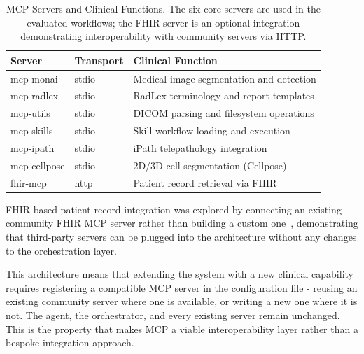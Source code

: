 \documentclass[conference]{IEEEtran}
\begin{document}
\begin{table}[t]
  \caption{MCP Servers and Clinical Functions. The six core servers are used in the evaluated workflows; the FHIR server is an optional integration demonstrating interoperability with community servers via HTTP.}
  \label{tab:mcp-servers}
  \centering
  \begin{tabular}{lll}
    \toprule
    Server & Transport & Clinical Function \\
    \midrule
    mcp-monai    & stdio & Medical image segmentation and detection \\
    mcp-radlex   & stdio & RadLex terminology and report templates \\
    mcp-utils    & stdio & DICOM parsing and filesystem operations \\
    mcp-skills   & stdio & Skill workflow loading and execution \\
    mcp-ipath    & stdio & iPath telepathology integration \\
    mcp-cellpose & stdio & 2D/3D cell segmentation (Cellpose) \\
    fhir-mcp     & http  & Patient record retrieval via FHIR \\
    \bottomrule
  \end{tabular}
\end{table}
FHIR-based patient record integration was explored by connecting an existing community FHIR MCP server rather than building a custom one~\cite{ehtesham2025mcpfhir}, demonstrating that third-party servers can be plugged into the architecture without any changes to the orchestration layer.

This architecture means that extending the system with a new clinical
capability requires registering a compatible MCP server in the configuration file - reusing an existing community server where one is available, or writing a new one where it is not. The agent, the orchestrator,
and every existing server remain unchanged.
This is the property that makes MCP a viable interoperability layer rather than a bespoke integration approach.


\end{document}
